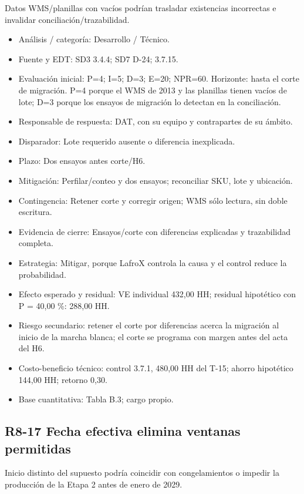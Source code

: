 Datos WMS/planillas con vacíos podrían trasladar existencias incorrectas e invalidar conciliación/trazabilidad.

\begin{itemize}[leftmargin=*,itemsep=3pt]
\item Análisis / categoría: Desarrollo / Técnico.
\item Fuente y EDT: SD3 3.4.4; SD7 D-24; 3.7.1\textendash{}5.
\item Evaluación inicial: P=4; I=5; D=3; E=20; NPR=60. Horizonte: hasta el corte de migración. P=4 porque el WMS de 2013 y las planillas tienen vacíos de lote; D=3 porque los ensayos de migración lo detectan en la conciliación.
\item Responsable de respuesta: DAT, con su equipo y contrapartes de su ámbito.
\item Disparador: Lote requerido ausente o diferencia inexplicada.
\item Plazo: Dos ensayos antes corte/H6.
\item Mitigación: Perfilar/conteo y dos ensayos; reconciliar SKU, lote y ubicación.
\item Contingencia: Retener corte y corregir origen; WMS sólo lectura, sin doble escritura.
\item Evidencia de cierre: Ensayos/corte con diferencias explicadas y trazabilidad completa.
\item Estrategia: Mitigar, porque LafroX controla la causa y el control reduce la probabilidad.
\item Efecto esperado y residual: VE individual 432,00 HH; residual hipotético con P = 40,00 \%: 288,00 HH.
\item Riesgo secundario: retener el corte por diferencias acerca la migración al inicio de la marcha blanca; el corte se programa con margen antes del acta del H6.
\item Costo-beneficio técnico: control 3.7.1, 480,00 HH del T-15; ahorro hipotético 144,00 HH; retorno 0,30.
\item Base cuantitativa: Tabla B.3; cargo propio.
\end{itemize}

\subsection*{R8-17 \textemdash{} Fecha efectiva elimina ventanas permitidas}

Inicio distinto del supuesto podría coincidir con congelamientos o impedir la producción de la Etapa 2 antes de enero de 2029.

